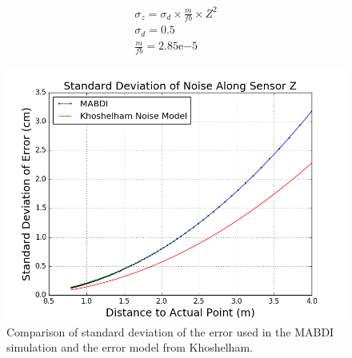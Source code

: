 \begin{gather}
  \sigma_z = \sigma_d \times \frac{m}{fb} \times Z^2 \\
  \sigma_d = 0.5 \\
  \frac{m}{fb} = 2.85\mathrm{e}{-5}
\end{gather}

\begin{figure}[h]%
\centering
  \includegraphics[width=.70\textwidth]{figures/depth_noise_error.png}
  \caption{Comparison of standard deviation of the error used in the MABDI simulation and the error model from Khoshelham.}
  \label{fig:depth_noise_error}
\end{figure}
